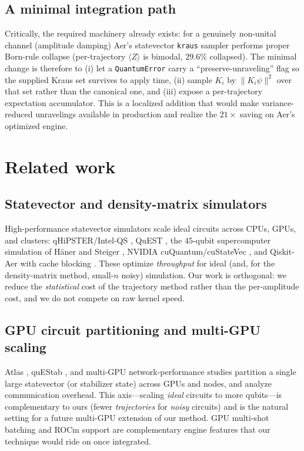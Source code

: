 \documentclass{ieeeaccess}
\newcommand{\expv}[1]{\langle #1 \rangle}
\begin{document}
\subsection{A minimal integration path}
Critically, the required machinery already exists: for a genuinely non-unital channel
(amplitude damping) Aer's statevector \texttt{kraus} sampler performs proper Born-rule collapse
(per-trajectory $\expv{Z}$ is bimodal, $29.6\%$ collapsed). The minimal change is therefore to
(i) let a \texttt{QuantumError} carry a ``preserve-unraveling'' flag so the supplied Kraus set
survives to apply time, (ii) sample $K_i$ by $\|K_i\psi\|^2$ over that set rather than the
canonical one, and (iii) expose a per-trajectory expectation accumulator. This is a localized
addition that would make variance-reduced unravelings available in production and realize the
$21\times$ saving on Aer's optimized engine.

\section{Related work}
\subsection{Statevector and density-matrix simulators}
High-performance statevector simulators scale ideal circuits across CPUs, GPUs, and clusters:
qHiPSTER/Intel-QS \cite{intelqs2020}, QuEST \cite{quest2019}, the $45$-qubit supercomputer
simulation of H\"aner and Steiger \cite{haner2017}, NVIDIA cuQuantum/cuStateVec
\cite{cuquantum2023}, and Qiskit-Aer \cite{qiskit_aer} with cache blocking
\cite{cacheblocking2020}. These optimize \emph{throughput} for ideal (and, for the
density-matrix method, small-$n$ noisy) simulation. Our work is orthogonal: we reduce the
\emph{statistical} cost of the trajectory method rather than the per-amplitude cost, and we do
not compete on raw kernel speed.

\subsection{GPU circuit partitioning and multi-GPU scaling}
Atlas \cite{atlas_sc24}, quEStab \cite{questab_ics25}, and multi-GPU network-performance studies
\cite{multigpu_network2025} partition a single large statevector (or stabilizer state) across GPUs
and nodes, and analyze communication overhead. This axis---scaling \emph{ideal} circuits to more
qubits---is complementary to ours (fewer \emph{trajectories} for \emph{noisy} circuits) and is the
natural setting for a future multi-GPU extension of our method. GPU multi-shot batching
\cite{efficient_multishot2023} and ROCm support \cite{rocm_qiskit2024} are complementary engine
features that our technique would ride on once integrated.
\end{document}
